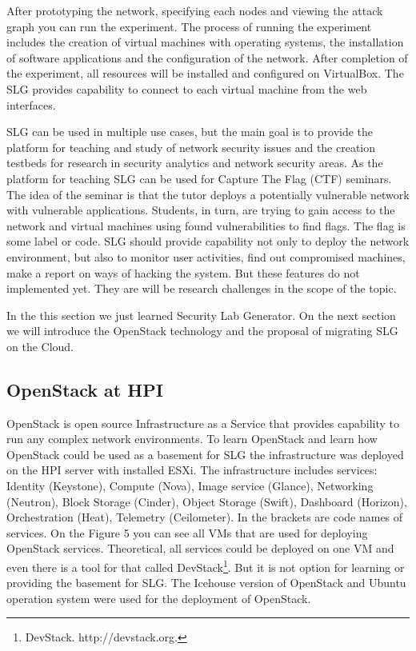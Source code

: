 After prototyping the network, specifying each nodes and viewing the attack graph you can run the experiment. The process of running the experiment includes the creation of virtual machines with operating systems, the installation of software applications and the configuration of the network. After completion of the experiment, all resources will be installed and configured on VirtualBox. The SLG provides capability to connect to each virtual machine from the web interfaces. 


SLG can be used in multiple use cases, but the main goal is to provide the platform for teaching and study of network security issues and the creation testbeds for research in security analytics and network security areas. 
As the platform for teaching SLG can be used for Capture The Flag (CTF) seminars. The idea of the seminar is that the tutor deploys a potentially vulnerable network with vulnerable applications. Students, in turn, are trying to gain access to the network and virtual machines using found vulnerabilities to find flags. The flag is some label or code. SLG should provide capability not only to deploy the network environment, but also to monitor user activities, find out compromised machines, make a report on ways of hacking the system. But these features do not implemented yet.  They are will be research challenges in the scope of the topic.
  
  
In the this section we just learned Security Lab Generator. On the next section we will introduce the OpenStack technology and the proposal of migrating SLG on the Cloud.


 




\subsection{OpenStack at HPI}
OpenStack is open source Infrastructure as a Service that provides capability to run any complex network environments. To learn OpenStack and learn how OpenStack could be used as a basement for SLG the infrastructure was deployed on the HPI server with installed ESXi. The infrastructure includes services: Identity (Keystone), Compute (Nova), Image service (Glance), Networking (Neutron), Block Storage (Cinder), Object Storage (Swift), Dashboard (Horizon), Orchestration (Heat), Telemetry (Ceilometer). In the brackets are code names of services. On the Figure 5 you can see all VMs that are used for deploying OpenStack services. Theoretical, all services could be deployed on one VM and even there is a tool for that called DevStack\footnote{DevStack. http://devstack.org.}. But it is not option for learning or providing the basement for SLG. The Icehouse version of OpenStack and Ubuntu operation system were used for the deployment of OpenStack.  

